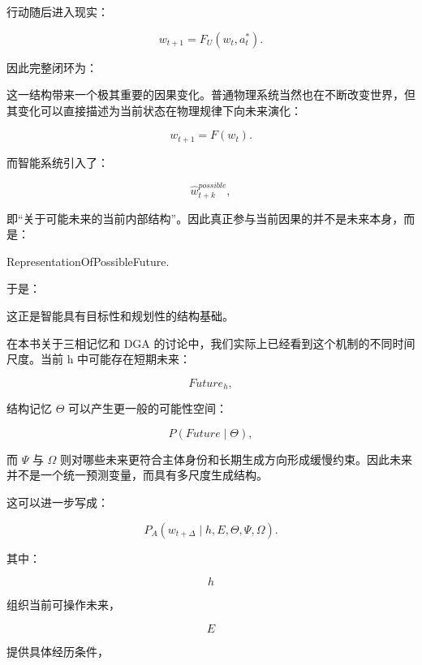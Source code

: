 行动随后进入现实：

\[
w_{t+1}
=
F_U(w_t,a_t^*).
\]

因此完整闭环为：

\begin{statementbox}
\centering
{}
\end{statementbox}

这一结构带来一个极其重要的因果变化。普通物理系统当然也在不断改变世界，但其变化可以直接描述为当前状态在物理规律下向未来演化：

\[
w_{t+1}
=
F(w_t).
\]

而智能系统引入了：

\[
\hat w_{t+k}^{possible},
\]

即“关于可能未来的当前内部结构”。因此真正参与当前因果的并不是未来本身，而是：

\begin{statementbox}
RepresentationOfPossibleFuture.
\end{statementbox}

于是：

\begin{statementbox}
\centering
{}
\end{statementbox}

这正是智能具有目标性和规划性的结构基础。

在本书关于三相记忆和 DGA 的讨论中，我们实际上已经看到这个机制的不同时间尺度。当前 h 中可能存在短期未来：

\[
Future_h,
\]

结构记忆 \(\Theta\) 可以产生更一般的可能性空间：

\[
P(
Future
\mid
\Theta
),
\]

而 \(\Psi\) 与 \(\Omega\) 则对哪些未来更符合主体身份和长期生成方向形成缓慢约束。因此未来并不是一个统一预测变量，而具有多尺度生成结构。

这可以进一步写成：

\[
P_A
\left(
w_{t+\Delta}
\mid
h,E,\Theta,\Psi,\Omega
\right).
\]

其中：

\[
h
\]

组织当前可操作未来，

\[
E
\]

提供具体经历条件，

